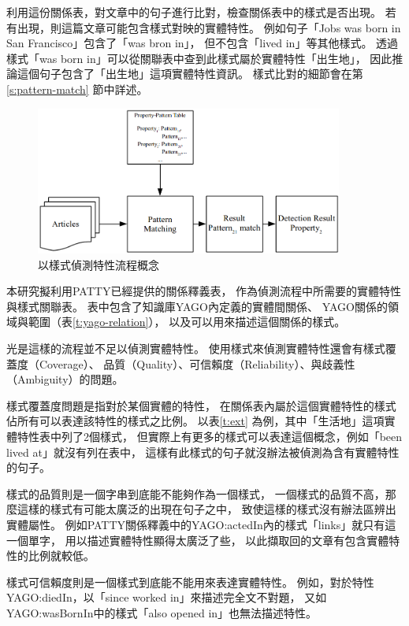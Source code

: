 利用這份關係表，對文章中的句子進行比對，檢查關係表中的樣式是否出現。
若有出現，則這篇文章可能包含樣式對映的實體特性。
例如句子「Jobs was born in San Francisco」包含了「was bron in」，
但不包含「lived in」等其他樣式。
透過樣式「was born in」可以從關聯表中查到此樣式屬於實體特性「出生地」，
因此推論這個句子包含了「出生地」這項實體特性資訊。
樣式比對的細節會在第\ref{s:pattern-match} 節中詳述。

\begin{figure}
    \centering
    \includegraphics[width=0.9\textwidth]{images/03-process-v1}
    \caption{以樣式偵測特性流程概念}
    \label{i:process-v1}
\end{figure}

本研究擬利用PATTY已經提供的關係釋義表，
作為偵測流程中所需要的實體特性與樣式關聯表。
表中包含了知識庫YAGO內定義的實體間關係、
YAGO關係的領域與範圍（表\ref{t:yago-relation}），
以及可以用來描述這個關係的樣式。



光是這樣的流程並不足以偵測實體特性。
使用樣式來偵測實體特性還會有樣式覆蓋度（Coverage）、
品質（Quality）、可信賴度（Reliability）、與歧義性（Ambiguity）的問題。

樣式覆蓋度問題是指對於某個實體的特性，
在關係表內屬於這個實體特性的樣式佔所有可以表達該特性的樣式之比例。
以表\ref{t:ext} 為例，其中「生活地」這項實體特性表中列了2個樣式，
但實際上有更多的樣式可以表達這個概念，例如「been lived at」就沒有列在表中，
這樣有此樣式的句子就沒辦法被偵測為含有實體特性的句子。

樣式的品質則是一個字串到底能不能夠作為一個樣式，   
一個樣式的品質不高，那麼這樣的樣式有可能太廣泛的出現在句子之中，
致使這樣的樣式沒有辦法區辨出實體屬性。
例如PATTY關係釋義中的YAGO:actedIn內的樣式「links」就只有這一個單字，
用以描述實體特性顯得太廣泛了些，
以此擷取回的文章有包含實體特性的比例就較低。

樣式可信賴度則是一個樣式到底能不能用來表達實體特性。
例如，對於特性YAGO:diedIn，以「since worked in」來描述完全文不對題，
又如YAGO:wasBornIn中的樣式「also opened in」也無法描述特性。

